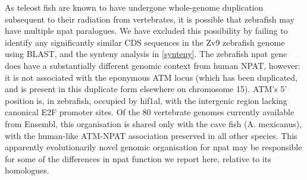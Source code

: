 \documentclass{ut-thesis}
\begin{document}
\begin{NoHyper}
As teleost fish are known to have undergone whole-genome duplication subsequent to their radiation from vertebrates, it is possible that zebrafish may have multiple npat paralogues. We have excluded this possibility by failing to identify any significantly similar CDS sequences in the Zv9 zebrafish genome using BLAST, and the synteny analysis in \autoref{synteny}. The zebrafish npat gene does have a substantially different genomic context from human NPAT, however: it is not associated with the eponymous ATM locus (which has been duplicated, and is present in this duplicate form elsewhere on chromosome 15). ATM’s 5’ position is, in zebrafish, occupied by hif1al, with the intergenic region lacking canonical E2F promoter sites. Of the 80 vertebrate genomes currently available from Ensembl, this organisation is shared only with the cave fish (A. mexicanus), with the human-like ATM-NPAT association preserved in all other species. This apparently evolutionarily novel genomic organisation for npat may be responsible for some of the differences in npat function we report here, relative to its homologues.


\end{NoHyper}
\end{document}
